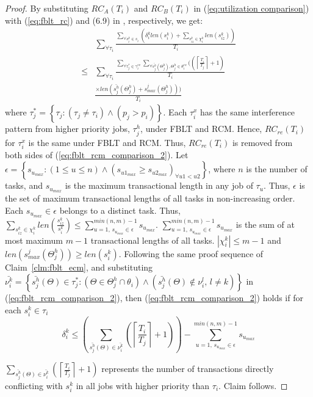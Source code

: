 \documentclass[conference]{IEEEtran}
\begin{document}
\begin{proof}
By substituting $RC_{A}(T_{i})$ and $RC_{B}(T_{i})$ in (\ref{eq:utilization comparison})
with (\ref{eq:fblt_rc}) and (6.9) in \cite{shambake_phd_proposal}, respectively, we get:
%
\begin{eqnarray}
 & \sum_{\forall\tau_{i}}\frac{\sum_{\forall s_{i}^{k}\in s_{i}}\left(\delta_i^klen(s_{i}^{k})+\sum_{s_{iz}^k\in \chi_i^k} len(s_{iz}^{k})\right)}{T_{i}}\nonumber\\
\le & \sum_{\forall\tau_{i}}\frac{\sum_{\forall\tau_{j}^{*}\in\gamma_{i}^{ex}}\sum_{\forall \bar{s_j^h}(\Theta_j^h),\Theta_j^h \in\theta_{i}^{ex}}\Big(\left(\left\lceil \frac{T_{i}}{T_{j}}\right\rceil +1\right)}{T_i}\nonumber\\
& \frac{\times len\left(\bar{s_{j}^{h}}(\Theta_j^h)+s_{max}^{j}(\Theta_j^h)\right)\Big)}{T_{i}}\label{eq:fblt_rcm_comparison_2} 
\end{eqnarray}
%
where $\tau_{j}^{*}=\left\{ \tau_{j}:\left(\tau_{j}\ne\tau_{i}\right)\wedge\left(p_{j}>p_{i}\right)\right\}$. Each $\tau_i^x$ has the same interference pattern from higher priority jobs, $\tau_j^h$, under FBLT and RCM. Hence, $RC_{re}(T_i)$ for $\tau_i^x$ is the same under FBLT and RCM. Thus, $RC_{re}(T_i)$ is removed from both sides of (\ref{eq:fblt_rcm_comparison_2}). Let $\epsilon=\left\{s_{u_{max}}:(1\le u \le n)\wedge \left(s_{u1_{max}} \ge s_{u2_{max}}\right)_{\forall u1 < u2}\right\}$, where $n$ is the number of tasks, and $s_{u_{max}}$ is the maximum transactional length in any job of $\tau_u$. Thus, $\epsilon$ is the set of maximum transactional lengths of all tasks in non-increasing order. Each $s_{u_{max}} \in \epsilon$ belongs to a distinct task. Thus, $\sum_{s_{iz}^{k} \in \chi_i^k}len\left(\frac{s_{iz}^{k}}{s_{i}^{k}}\right)\le \sum_{u=1,\,s_{u_{max}}\in \epsilon}^{min(n,m)-1} s_{u_{max}}$. $\sum_{u=1,\,s_{u_{max}}\in \epsilon}^{min(n,m)-1} s_{u_{max}}$ is the sum of at most maximum $m-1$ transactional lengths of all tasks. $|\chi_i^k|\le m-1$ and $len(s_{max}^{j}(\Theta_j^h)) \ge len(s_{i}^{k})$.
%
Following the same proof sequence of Claim~\ref{clm:fblt_ecm}, 
%
and substituting $\bar{\nu_i^k}=\left\{ \bar{s_{j}^{h}}(\Theta)\in\tau_{j}^{*}:\left(\Theta \in \Theta_j^h \cap \theta_{i}\right)\wedge\left(\bar{s_{j}^{h}}(\Theta)\not\in\nu_{i}^{l},\, l\ne k\right)\right\}$ in (\ref{eq:fblt_rcm_comparison_2}), 
%
then (\ref{eq:fblt_rcm_comparison_2}) holds if for each $s_{i}^{k}\in\tau_{i}$ 
%
\begin{equation}
\delta_i^k\le\left(\sum_{\bar{s_{j}^{h}}(\Theta)\in\bar{\nu_{i}^{k}}}\left(\left\lceil \frac{T_{i}}{T_{j}}\right\rceil +1\right)\right)-\sum_{u=1,\,s_{u_{max}}\in \epsilon}^{min(n,m)-1} s_{u_{max}} \label{eq:fblt_rcm_comparison_16}
\end{equation}

$\sum_{\bar{s_{j}^{h}}(\Theta)\in \bar{\nu_{i}^{k}}}\left(\left\lceil \frac{T_{i}}{T_{j}}\right\rceil +1\right)$
represents the number of transactions directly conflicting with $s_{i}^{k}$ in all jobs with higher priority than $\tau_{i}$. Claim follows.
\end{proof}
%
\end{document}
